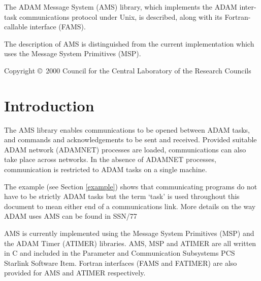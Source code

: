 \documentclass[twoside,11pt]{article}
\newcommand{\stardocinitials}  {SUN}
\newcommand{\stardoccopyright}
{Copyright
\copyright\ 2000 Council for the Central Laboratory of the Research Councils}
\newcommand{\stardocnumber}    {241.0}
\newcommand{\stardocabstract}  {The ADAM Message System (AMS) library, which
implements the ADAM inter-task communications protocol under Unix, is
described, along with its Fortran-callable interface (FAMS).

The description of AMS is distinguished from the current implementation which
uses the Message System Primitives (MSP).}
\newcommand{\stardocname}{\stardocinitials /\stardocnumber}
\newcommand{\htmlref}[2]{#1}
\newenvironment{latexonly}{}{}
\newcommand{\latex}[1]{#1}
\newcommand{\xref}[3]{#1}
\renewcommand{\_}{\texttt{\symbol{95}}}
\renewcommand{\thepage}{\roman{page}}
\begin{document}
\stardocabstract

\begin{latexonly}
\newpage
\vspace*{\fill}
\stardoccopyright
\end{latexonly}

  \newpage
  \begin{latexonly}
    \setlength{\parskip}{0mm}
    \tableofcontents
    \setlength{\parskip}{\medskipamount}
    \markboth{\stardocname}{\stardocname}
  \end{latexonly}

\cleardoublepage
\renewcommand{\thepage}{\arabic{page}}
\setcounter{page}{1}

\section{Introduction}
The AMS library enables communications to be opened between ADAM tasks, and
commands and acknowledgements to be sent and received. Provided suitable ADAM
network (ADAMNET) processes are loaded, communications can also take place
across networks.
In the absence of ADAMNET processes, communication is restricted to ADAM
tasks on a single machine.

The
\htmlref{example}{example} \latex{ (see Section \ref{example})}
shows that communicating programs do not have to be strictly ADAM tasks but
the term `task' is used throughout this document to mean either end of a
communications link.
More details on the way ADAM uses AMS can be found in
\xref{SSN/77}{ssn77}{}

AMS is currently implemented using the Message System Primitives (MSP) and the
ADAM Timer (ATIMER) libraries.
AMS, MSP and ATIMER are all written in C and included in the Parameter and
Communication Subsystems
\xref{PCS}{ssn29}{}
Starlink Software Item. Fortran interfaces (FAMS and FATIMER) are also provided
for AMS and ATIMER respectively.
\end{document}
